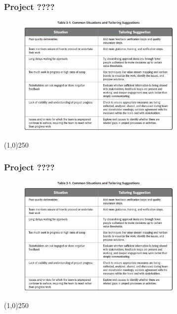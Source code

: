 \begin{frame}
\frametitle{Project ????}
 \begin{figure}
    \centering
        \includegraphics[width = 8cm]{../images/guide/Table3-1.jpg}
    \label{guideTable:3-1}
 \end{figure}
\end{frame}
\begin{center}\line(1,0){250}\end{center}





\begin{frame}
\frametitle{Project ????}
 \begin{figure}
    \centering
        \includegraphics[width = 8cm]{../images/guide/Table3-1.jpg}
    \label{guideTable:3-1}
 \end{figure}
\end{frame}
\begin{center}\line(1,0){250}\end{center}


